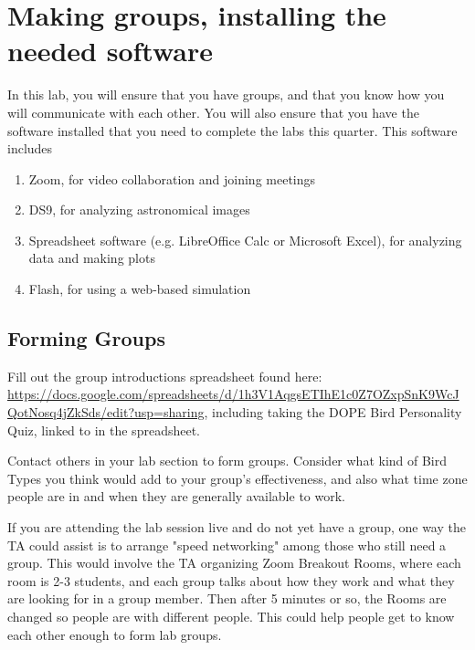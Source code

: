 \chapter{Making groups, installing the needed software}


In this lab, you will ensure that you have groups, and that you know how you will communicate with each other. You will also ensure that you have the software installed that you need to complete the labs this quarter. This software includes
\begin{enumerate}
	\item Zoom, for video collaboration and joining meetings
	\item DS9, for analyzing astronomical images
	\item Spreadsheet software (e.g. LibreOffice Calc or Microsoft Excel), for analyzing data and making plots
	\item Flash, for using a web-based simulation
\end{enumerate}

\section{Forming Groups}

\begin{steps}
 \item Fill out the group introductions spreadsheet found here: \url{https://docs.google.com/spreadsheets/d/1h3V1AqgsETIhE1c0Z7OZxpSnK9WcJQotNosq4jZkSds/edit?usp=sharing}, including taking the DOPE Bird Personality Quiz, linked to in the spreadsheet.
 
 \item Contact others in your lab section to form groups. Consider what kind of Bird Types you think would add to your group's effectiveness, and also what time zone people are in and when they are generally available to work.
\end{steps}

If you are attending the lab session live and do not yet have a group, one way the TA could assist is to arrange "speed networking" among those who still need a group. This would involve the TA organizing Zoom Breakout Rooms, where each room is 2-3 students, and each group talks about how they work and what they are looking for in a group member. Then after 5 minutes or so, the Rooms are changed so people are with different people. This could help people get to know each other enough to form lab groups.

